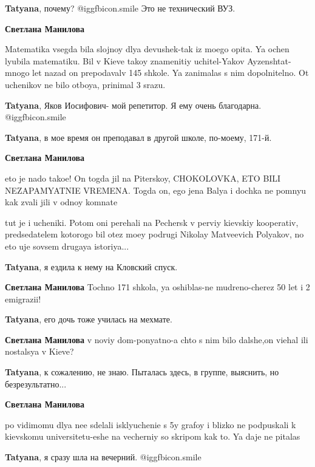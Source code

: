 \begin{itemize}
\begin{itemize} %
\textbf{Tatyana}, почему? @igg{fbicon.smile} Это не технический ВУЗ.

\begin{itemize} %
\textbf{Светлана Манилова} 

Matematika vsegda bila slojnoy dlya devushek-tak iz moego opita. Ya ochen
lyubila matematiku. Bil v Kieve takoy znamenitiy uchitel-Yakov Ayzenshtat-mnogo
let nazad on prepodavalv 145 shkole. Ya zanimalas s nim dopolnitelno. Ot
uchenikov ne bilo otboya, prinimal 3 srazu.

\textbf{Tatyana}, Яков Иосифович- мой репетитор. Я ему очень благодарна. @igg{fbicon.smile} 

\textbf{Tatyana}, в мое время он преподавал в другой школе, по-моему, 171-й.

\textbf{Светлана Манилова} 

eto je nado takoe! On togda jil na Piterskoy, CHOKOLOVKA, ETO BILI NEZAPAMYATNIE
VREMENA. Togda on, ego jena Balya i dochka ne pomnyu kak zvali jili v odnoy
komnate


tut je i ucheniki. Potom oni perehali na Pechersk v perviy kievskiy
kooperativ, predsedatelem kotorogo bil otez moey podrugi Nikolay Matveevich
Polyakov, no eto uje sovsem drugaya istoriya...

\textbf{Tatyana}, я ездила к нему на Кловский спуск.

\textbf{Светлана Манилова} Tochno 171 shkola, ya oshiblas-ne mudreno-cherez 50 let i 2 emigrazii!

\textbf{Tatyana}, его дочь тоже училась на мехмате.

\textbf{Светлана Манилова} v noviy dom-ponyatno-a chto s nim bilo dalshe,on viehal ili nostalsya v Kieve?

\textbf{Tatyana}, к сожалению, не знаю. Пыталась здесь, в группе, выяснить, но безрезультатно...

\textbf{Светлана Манилова} 

po vidimomu dlya nee sdelali isklyuchenie s 5y grafoy i blizko ne podpuskali k
kievskomu universitetu-eshe na vecherniy so skripom kak to. Ya daje ne pitalas


\textbf{Tatyana}, я сразу шла на вечерний.  @igg{fbicon.smile} 


\end{itemize}
\end{itemize}
\end{itemize}

